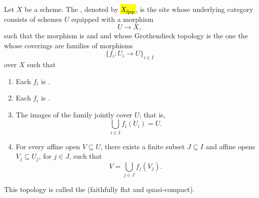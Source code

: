 \begin{definition} \label{definition:small_fpqc_site_of_a_schem}
    \TODO{}
    Let $X$ be a scheme. The , denoted by \hl{$X_{\mathrm{fpqc}}$},
    is the site whose underlying category consists of schemes $U$ equipped with a morphism
    $$
    U \longrightarrow X,
    $$
    such that the morphism is  and  and whose Grothendieck topology is the one  the  whose coverings are families of morphisms
    $$
    \{f_i : U_i \to U\}_{i \in I}
    $$
    over $X$ such that

    \begin{enumerate}
        \item Each $f_i$ is .
        \item Each $f_i$ is .
        \item The images of the family jointly cover $U$; that is,
        $$
        \bigcup_{i \in I} f_i(U_i) = U.
        $$
        \item For every affine open $V \subseteq U$, there exists a finite subset $J \subseteq I$ and affine opens $V_j \subseteq U_j$, for $j \in J$, such that
        $$
        V = \bigcup_{j \in J} f_j(V_j).
        $$
    \end{enumerate}

    This topology is called the  (faithfully flat and quasi-compact).
\end{definition}